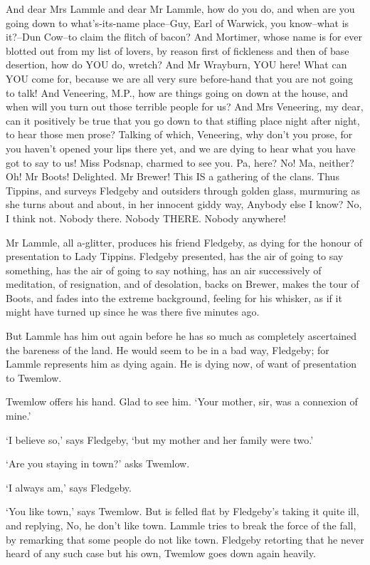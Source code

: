 And dear Mrs Lammle and dear Mr Lammle, how do you do, and when are
you going down to what’s-its-name place--Guy, Earl of Warwick, you
know--what is it?--Dun Cow--to claim the flitch of bacon? And Mortimer,
whose name is for ever blotted out from my list of lovers, by reason
first of fickleness and then of base desertion, how do YOU do, wretch?
And Mr Wrayburn, YOU here! What can YOU come for, because we are all
very sure before-hand that you are not going to talk! And Veneering,
M.P., how are things going on down at the house, and when will you turn
out those terrible people for us? And Mrs Veneering, my dear, can it
positively be true that you go down to that stifling place night after
night, to hear those men prose? Talking of which, Veneering, why don’t
you prose, for you haven’t opened your lips there yet, and we are dying
to hear what you have got to say to us! Miss Podsnap, charmed to see
you. Pa, here? No! Ma, neither? Oh! Mr Boots! Delighted. Mr Brewer!
This IS a gathering of the clans. Thus Tippins, and surveys Fledgeby and
outsiders through golden glass, murmuring as she turns about and about,
in her innocent giddy way, Anybody else I know? No, I think not. Nobody
there. Nobody THERE. Nobody anywhere!

Mr Lammle, all a-glitter, produces his friend Fledgeby, as dying for the
honour of presentation to Lady Tippins. Fledgeby presented, has the air
of going to say something, has the air of going to say nothing, has an
air successively of meditation, of resignation, and of desolation,
backs on Brewer, makes the tour of Boots, and fades into the extreme
background, feeling for his whisker, as if it might have turned up since
he was there five minutes ago.

But Lammle has him out again before he has so much as completely
ascertained the bareness of the land. He would seem to be in a bad way,
Fledgeby; for Lammle represents him as dying again. He is dying now, of
want of presentation to Twemlow.

Twemlow offers his hand. Glad to see him. ‘Your mother, sir, was a
connexion of mine.’

‘I believe so,’ says Fledgeby, ‘but my mother and her family were two.’

‘Are you staying in town?’ asks Twemlow.

‘I always am,’ says Fledgeby.

‘You like town,’ says Twemlow. But is felled flat by Fledgeby’s taking
it quite ill, and replying, No, he don’t like town. Lammle tries to
break the force of the fall, by remarking that some people do not like
town. Fledgeby retorting that he never heard of any such case but his
own, Twemlow goes down again heavily.


